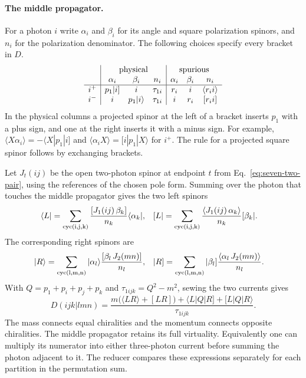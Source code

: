 \paragraph{The middle propagator.}
For a photon $i$ write $\alpha_i$ and $\beta_i$ for its angle and
square polarization spinors, and $n_i$ for the polarization denominator.
The following choices specify every bracket in $D$.
\[
\begin{array}{c|ccc|ccc}
 &\multicolumn{3}{c|}{\text{physical}}&\multicolumn{3}{c}{\text{spurious}}\\
 &\alpha_i&\beta_i&n_i&\alpha_i&\beta_i&n_i\\ \hline
 i^+&p_1|i]&i&\tau_{1i}&r_i&i&\langle r_i i\rangle\\
 i^-&i&p_1|i\rangle&\tau_{1i}&i&r_i&[r_i i]
\end{array}
\]
In the physical columns a projected spinor at the left of a bracket
inserts $p_1$ with a plus sign, and one at the right inserts it with
a minus sign. For example,
$\langle X\alpha_i\rangle=-\langle X|p_1|i]$ and
$\langle\alpha_i X\rangle=[i|p_1|X\rangle$ for $i^+$.
The rule for a projected square spinor follows by exchanging brackets.

Let $J_t(ij)$ be the open two-photon spinor at endpoint $t$ from
Eq.~\eqref{eq:seven-two-pair}, using the references of the chosen
pole form. Summing over the photon that touches the middle
propagator gives the two left spinors
\begin{align}
 \langle L|&=\sum_{\rm cyc(i,j,k)}
   \frac{[J_1(ij)\,\beta_k]}{n_k}\langle\alpha_k|,&
 [L|&=\sum_{\rm cyc(i,j,k)}
   \frac{\langle J_1(ij)\,\alpha_k\rangle}{n_k}[\beta_k|.\nonumber
\end{align}
The corresponding right spinors are
\begin{align}
 |R\rangle&=\sum_{\rm cyc(l,m,n)}
  |\alpha_l\rangle\frac{[\beta_l\,J_2(mn)]}{n_l},&
 |R]&=\sum_{\rm cyc(l,m,n)}
  |\beta_l]\frac{\langle\alpha_l\,J_2(mn)\rangle}{n_l}.\nonumber
\end{align}
With $Q=p_1+p_i+p_j+p_k$ and $\tau_{1ijk}=Q^2-m^2$, sewing the two currents gives
\begin{equation}\label{eq:eight-two-bridge}
 D(ijk|lmn)=
 \frac{m\big(\langle LR\rangle+[LR]\big)
       +\langle L|Q|R]+[L|Q|R\rangle}{\tau_{1ijk}} .
\end{equation}
The mass connects equal chiralities and the momentum connects opposite
chiralities. The middle propagator retains its full virtuality.
Equivalently one can multiply its numerator into either three-photon
current before summing the photon adjacent to it. The reducer compares
these expressions separately for each partition in the permutation sum.

